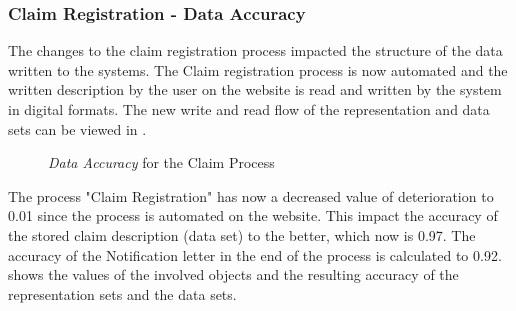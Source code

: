 \subsubsection{Claim Registration - Data Accuracy}
The changes to the claim registration process impacted the structure of the data written to the systems. The Claim registration process is now automated and the written description by the user on the website is read and written by the system in digital formats. The new write and read flow of the representation and data sets can be viewed in . 
\label{sec:claim_analysis_to_be}
	\begin{center}
		\begin{figure}[H]
			\centering
			\setlength\fboxsep{7pt}
			\setlength\fboxrule{0.5pt}
			\caption{\textsl{Data Accuracy} for the Claim Process}
			\label{fig:map_claim_data_to_be}
		\end{figure}
	\end{center}
	The process "Claim Registration" has now a decreased value of deterioration to 0.01 since the process is automated on the website. This impact the accuracy of the stored claim description (data set) to the better, which now is 0.97. The accuracy of the Notification letter in the end of the process is calculated to 0.92.  shows the values of the involved objects and the resulting accuracy of the representation sets and the data sets.

%
